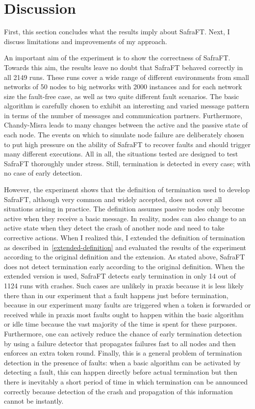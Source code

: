 \section{Discussion}
\label{sec:discussion}
First, this section concludes what the results imply about SafraFT. Next, I discuss limitations and improvements of my approach.

An important aim of the experiment is to show the correctness of SafraFT.
Towards this aim, the results leave no doubt that SafraFT behaved correctly in all 2149 %
runs.
These runs cover a wide range of different environments from small networks of 50 nodes to big networks with 2000 instances and for each network size the fault-free case, as well as two quite different fault scenarios.
The basic algorithm is carefully chosen to exhibit an interesting and varied message pattern in terms of the number of messages and communication partners.
Furthermore, Chandy-Misra leads to many changes between the active and the passive state of each node.
The events on which to simulate node failure are deliberately chosen to put high pressure on the ability of SafraFT to recover faults and should trigger many different executions.
All in all, the situations tested are designed to test SafraFT thoroughly under stress.
Still, termination is detected in every case; with no case of early detection.

However, the experiment shows that the definition of termination used to develop SafraFT, although very common and widely accepted, does not cover all situations arising in practice.
The definition assumes passive nodes only become active when they receive a basic message.
In reality, nodes can also change to an active state when they detect the crash of another node and need to take corrective actions.
When I realized this, I extended the definition of termination as described in~\cref{extended-definition} and evaluated the results of the experiment according to the original definition and the extension.
As stated above, SafraFT does not detect termination early according to the original definition.
When the extended version is used, SafraFT detects early termination in only 14 out of 1124 runs with crashes. %
Such cases are unlikely in praxis because it is less likely there than in our experiment that a fault happens just before termination, because in our experiment many faults are triggered when a token is forwarded or received while in praxis most faults ought to happen within the basic algorithm or idle time because the vast majority of the time is spent for these purposes.
Furthermore, one can actively reduce the chance of early termination detection by using a failure detector that propagates failures fast to all nodes and then enforces an extra token round.
Finally, this is a general problem of termination detection in the presence of faults:
when a basic algorithm can be activated by detecting a fault, this can happen directly before actual termination but then there is inevitably a short period of time in which termination can be announced correctly because detection of the crash  and propagation of this information cannot be instantly.

